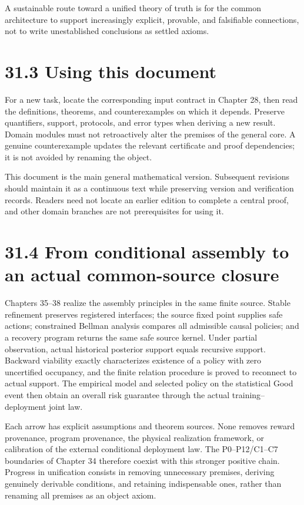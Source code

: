 \documentclass[
  english,
  11pt,
  oneside]{book}
\begin{document}
A sustainable route toward a unified theory of truth is for the common architecture to support increasingly explicit, provable, and falsifiable connections, not to write unestablished conclusions as settled axioms.

\section{31.3 Using this document}\label{using-this-document}

For a new task, locate the corresponding input contract in Chapter 28, then read the definitions, theorems, and counterexamples on which it depends. Preserve quantifiers, support, protocols, and error types when deriving a new result. Domain modules must not retroactively alter the premises of the general core. A genuine counterexample updates the relevant certificate and proof dependencies; it is not avoided by renaming the object.

This document is the main general mathematical version. Subsequent revisions should maintain it as a continuous text while preserving version and verification records. Readers need not locate an earlier edition to complete a central proof, and other domain branches are not prerequisites for using it.

\section{31.4 From conditional assembly to an actual common-source closure}\label{from-conditional-assembly-to-an-actual-common-source-closure}

Chapters 35--38 realize the assembly principles in the same finite source. Stable refinement preserves registered interfaces; the source fixed point supplies safe actions; constrained Bellman analysis compares all admissible causal policies; and a recovery program returns the same safe source kernel. Under partial observation, actual historical posterior support equals recursive support. Backward viability exactly characterizes existence of a policy with zero uncertified occupancy, and the finite relation procedure is proved to reconnect to actual support. The empirical model and selected policy on the statistical Good event then obtain an overall risk guarantee through the actual training--deployment joint law.

Each arrow has explicit assumptions and theorem sources. None removes reward provenance, program provenance, the physical realization framework, or calibration of the external conditional deployment law. The P0--P12/C1--C7 boundaries of Chapter 34 therefore coexist with this stronger positive chain. Progress in unification consists in removing unnecessary premises, deriving genuinely derivable conditions, and retaining indispensable ones, rather than renaming all premises as an object axiom.
\end{document}
